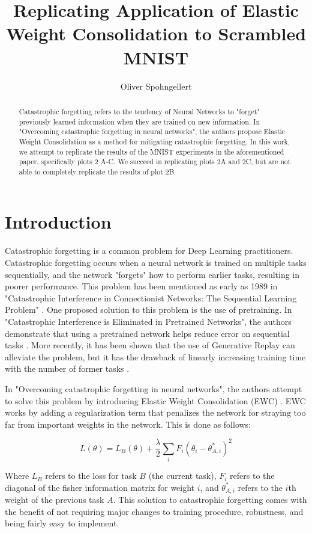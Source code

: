 \documentclass{article}
\title{Replicating Application of Elastic Weight Consolidation to Scrambled MNIST}
\author{
	Oliver Spohngellert
}
\begin{document}
\maketitle

\begin{abstract}
	Catastrophic forgetting refers to the tendency of Neural Networks to "forget" previously learned information when they are trained on new information. In "Overcoming catastrophic forgetting in neural networks", the authors propose Elastic Weight Consolidation as a method for mitigating catastrophic forgetting. In this work, we attempt to replicate the results of the MNIST experiments in the aforementioned paper, specifically plots 2 A-C. We succeed in replicating plots 2A and 2C, but are not able to completely replicate the results of plot 2B.
\end{abstract}

\section{Introduction}

Catastrophic forgetting is a common problem for Deep Learning practitioners. Catastrophic forgetting occurs when a neural network is trained on multiple tasks sequentially, and the network "forgets" how to perform earlier tasks, resulting in poorer performance. This problem has been mentioned as early as 1989 in "Catastrophic Interference in Connectionist Networks: The Sequential Learning Problem" \cite{cfo1989}. One proposed solution to this problem is the use of pretraining. In "Catastrophic Interference is Eliminated in Pretrained Networks", the authors demonstrate that using a pretrained network helps reduce error on sequential tasks \cite{pretrain}. More recently, it has been shown that the use of Generative Replay can alleviate the problem, but it has the drawback of linearly increasing training time with the number of former tasks \cite{generative}.

In "Overcoming catastrophic forgetting in neural networks", the authors attempt to solve this problem by introducing Elastic Weight Consolidation (EWC) \cite{ewc}. EWC works by adding a regularization term that penalizes the network for straying too far from important weights in the network. This is done as follows:

$$
L(\theta) = L_{B}(\theta) + \frac{\lambda}{2} \sum_{i}F_{i}(\theta_{i} - \theta^{*}_{A,i})^2
$$

Where $L_{B}$ refers to the loss for task $B$ (the current task), $F_i$ refers to the diagonal of the fisher information matrix for weight $i$, and $\theta^{*}_{A,i}$ refers to the $i$th weight of the previous task $A$. This solution to catastrophic forgetting comes with the benefit of not requiring major changes to training procedure, robustness, and being fairly easy to implement. 
\end{document}
